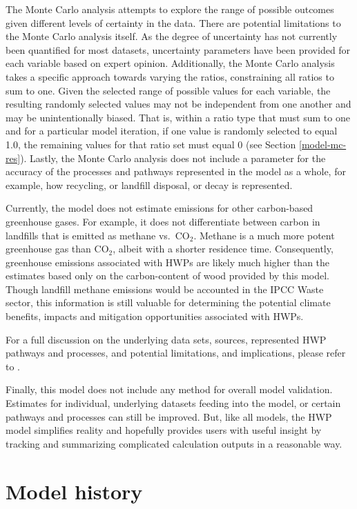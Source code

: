 \documentclass[
  openany]{book}
\begin{document}
The Monte Carlo analysis attempts to explore the range of possible outcomes given different levels of certainty in the data. There are potential limitations to the Monte Carlo analysis itself. As the degree of uncertainty has not currently been quantified for most datasets, uncertainty parameters have been provided for each variable based on expert opinion. Additionally, the Monte Carlo analysis takes a specific approach towards varying the ratios, constraining all ratios to sum to one. Given the selected range of possible values for each variable, the resulting randomly selected values may not be independent from one another and may be unintentionally biased. That is, within a ratio type that must sum to one and for a particular model iteration, if one value is randomly selected to equal 1.0, the remaining values for that ratio set must equal 0 (see Section \ref{model-mc-res}). Lastly, the Monte Carlo analysis does not include a parameter for the accuracy of the processes and pathways represented in the model as a whole, for example, how recycling, or landfill disposal, or decay is represented.

Currently, the model does not estimate emissions for other carbon-based greenhouse gases. For example, it does not differentiate between carbon in landfills that is emitted as methane vs.~CO\(_2\). Methane is a much more potent greenhouse gas than CO\(_2\), albeit with a shorter residence time. Consequently, greenhouse emissions associated with HWPs are likely much higher than the estimates based only on the carbon-content of wood provided by this model. Though landfill methane emissions would be accounted in the IPCC Waste sector, this information is still valuable for determining the potential climate benefits, impacts and mitigation opportunities associated with HWPs.

For a full discussion on the underlying data sets, sources, represented HWP pathways and processes, and potential limitations, and implications, please refer to \textcite{lucey202X}.

Finally, this model does not include any method for overall model validation. Estimates for individual, underlying datasets feeding into the model, or certain pathways and processes can still be improved. But, like all models, the HWP model simplifies reality and hopefully provides users with useful insight by tracking and summarizing complicated calculation outputs in a reasonable way.

\hypertarget{int-hist}{%
\section{Model history}\label{int-hist}}
\end{document}
